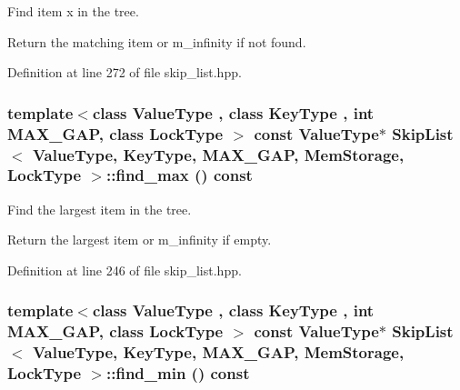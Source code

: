 Find item x in the tree. 

Return the matching item or m\_\-infinity if not found. 

Definition at line 272 of file skip\_\-list.hpp.\hypertarget{classSkipList_3_01ValueType_00_01KeyType_00_01MAX__GAP_00_01MemStorage_00_01LockType_01_4_b9bd70f284edf7639c7f2320fe39176a}{
\subsubsection[{find\_\-max}]{\setlength{\rightskip}{0pt plus 5cm}template$<$class ValueType , class KeyType , int MAX\_\-GAP, class LockType $>$ const ValueType$\ast$ SkipList$<$ ValueType, KeyType, MAX\_\-GAP, MemStorage, LockType $>$::find\_\-max () const}}
\label{classSkipList_3_01ValueType_00_01KeyType_00_01MAX__GAP_00_01MemStorage_00_01LockType_01_4_b9bd70f284edf7639c7f2320fe39176a}


Find the largest item in the tree. 

Return the largest item or m\_\-infinity if empty. 

Definition at line 246 of file skip\_\-list.hpp.\hypertarget{classSkipList_3_01ValueType_00_01KeyType_00_01MAX__GAP_00_01MemStorage_00_01LockType_01_4_3a779082b51cc31b13d0cd88931f6952}{
\subsubsection[{find\_\-min}]{\setlength{\rightskip}{0pt plus 5cm}template$<$class ValueType , class KeyType , int MAX\_\-GAP, class LockType $>$ const ValueType$\ast$ SkipList$<$ ValueType, KeyType, MAX\_\-GAP, MemStorage, LockType $>$::find\_\-min () const}}
\label{classSkipList_3_01ValueType_00_01KeyType_00_01MAX__GAP_00_01MemStorage_00_01LockType_01_4_3a779082b51cc31b13d0cd88931f6952}



